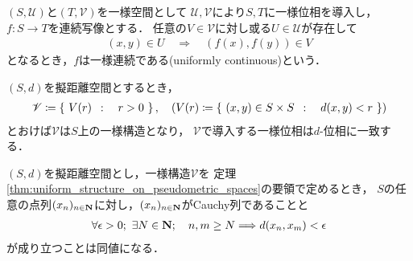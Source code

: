 	\begin{screen}
		\begin{dfn}[一様連続性]
			$(S,\mathscr{U})$と$(T,\mathscr{V})$を一様空間として
			$\mathscr{U},\mathscr{V}$により$S,T$に一様位相を導入し，
			$f:S \longrightarrow T$を連続写像とする．
			任意の$V \in \mathscr{V}$に対し或る$U \in \mathscr{U}$が存在して
			\begin{align}
				(x,y) \in U \quad \Longrightarrow \quad (f(x),f(y)) \in V
			\end{align}
			となるとき，$f$は一様連続である(uniformly continuous)という．
		\end{dfn}
	\end{screen}
	
	\begin{screen}
		\begin{thm}[擬距離空間の一様構造]
		\label{thm:uniform_structure_on_pseudometric_spaces}
			$(S,d)$を擬距離空間とするとき，
			\begin{align}
				\mathscr{V} \coloneqq
				\left\{\ V(r)\ \, : \quad r > 0\ \right\},
				\quad (V(r) \coloneqq \left\{\ (x,y) \in S \times S\ \, : \quad d(x,y) < r\ \right\})
			\end{align}
			とおけば$\mathscr{V}$は$S$上の一様構造となり，
			$\mathscr{V}$で導入する一様位相は$d$-位相に一致する．
		\end{thm}
	\end{screen}
	
	\begin{screen}
		\begin{thm}[擬距離空間のCauchy列]
		\label{thm:Cauchy_sequences_on_pseudometric_spaces}
			$(S,d)$を擬距離空間とし，一様構造$\mathscr{V}$を
			定理\ref{thm:uniform_structure_on_pseudometric_spaces}の要領で定めるとき，
			$S$の任意の点列$(x_n)_{n \in \mathbf{N}}$に対し，$(x_n)_{n \in \mathbf{N}}$がCauchy列であることと
			\begin{align}
				\forall \epsilon > 0;\ 
				\exists N \in \N;\quad
				n,m \geq N \Longrightarrow d(x_n,x_m) < \epsilon
				\label{eq:thm_Cauchy_sequences_on_pseudometric_spaces}
			\end{align}
			が成り立つことは同値になる．
		\end{thm}
	\end{screen}
	
